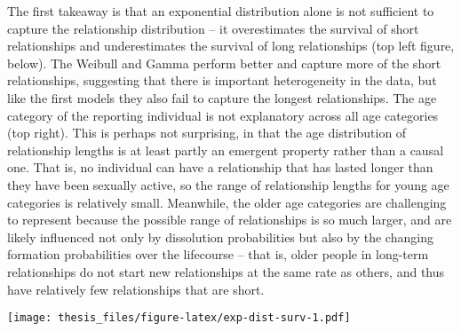 \documentclass [11pt, proquest] {uwthesis}[2015/03/03]
\begin{document}
The first takeaway is that an exponential distribution alone is not
sufficient to capture the relationship distribution -- it overestimates
the survival of short relationships and underestimates the survival of
long relationships (top left figure, below). The Weibull and Gamma
perform better and capture more of the short relationships, suggesting
that there is important heterogeneity in the data, but like the first
models they also fail to capture the longest relationships. The age
category of the reporting individual is not explanatory across all age
categories (top right). This is perhaps not surprising, in that the age
distribution of relationship lengths is at least partly an emergent
property rather than a causal one. That is, no individual can have a
relationship that has lasted longer than they have been sexually active,
so the range of relationship lengths for young age categories is
relatively small. Meanwhile, the older age categories are challenging to
represent because the possible range of relationships is so much larger,
and are likely influenced not only by dissolution probabilities but also
by the changing formation probabilities over the lifecourse -- that is,
older people in long-term relationships do not start new relationships
at the same rate as others, and thus have relatively few relationships
that are short.

\texttt{[image: thesis\_files/figure-latex/exp-dist-surv-1.pdf]}
\end{document}
